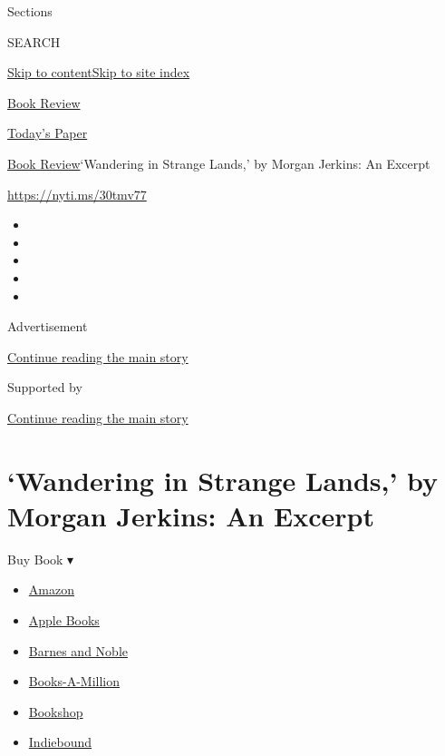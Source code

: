 Sections

SEARCH

\protect\hyperlink{site-content}{Skip to
content}\protect\hyperlink{site-index}{Skip to site index}

\href{https://www.nytimes.com/section/books/review}{Book Review}

\href{https://myaccount.nytimes.com/auth/login?response_type=cookie\&client_id=vi}{}

\href{https://www.nytimes.com/section/todayspaper}{Today's Paper}

\href{/section/books/review}{Book Review}\textbar{}`Wandering in Strange
Lands,' by Morgan Jerkins: An Excerpt

\url{https://nyti.ms/30tmv77}

\begin{itemize}
\item
\item
\item
\item
\item
\end{itemize}

Advertisement

\protect\hyperlink{after-top}{Continue reading the main story}

Supported by

\protect\hyperlink{after-sponsor}{Continue reading the main story}

\hypertarget{wandering-in-strange-lands-by-morgan-jerkins-an-excerpt}{%
\section{`Wandering in Strange Lands,' by Morgan Jerkins: An
Excerpt}\label{wandering-in-strange-lands-by-morgan-jerkins-an-excerpt}}

Buy Book ▾

\begin{itemize}
\tightlist
\item
  \href{https://www.amazon.com/gp/search?index=books\&tag=NYTBSREV-20\&field-keywords=Wandering+in+Strange+Lands\%3A+A+Daughter+of+the+Great+Migration+Reclaims+Her+Roots+Morgan+Jerkins}{Amazon}
\item
  \href{https://du-gae-books-dot-nyt-du-prd.appspot.com/buy?title=Wandering+in+Strange+Lands\%3A+A+Daughter+of+the+Great+Migration+Reclaims+Her+Roots\&author=Morgan+Jerkins}{Apple
  Books}
\item
  \href{https://www.anrdoezrs.net/click-7990613-11819508?url=https\%3A\%2F\%2Fwww.barnesandnoble.com\%2Fw\%2F\%3Fean\%3D9780062873040}{Barnes
  and Noble}
\item
  \href{https://www.anrdoezrs.net/click-7990613-35140?url=https\%3A\%2F\%2Fwww.booksamillion.com\%2Fp\%2FWandering\%2Bin\%2BStrange\%2BLands\%253A\%2BA\%2BDaughter\%2Bof\%2Bthe\%2BGreat\%2BMigration\%2BReclaims\%2BHer\%2BRoots\%2FMorgan\%2BJerkins\%2F9780062873040}{Books-A-Million}
\item
  \href{https://bookshop.org/a/3546/9780062873040}{Bookshop}
\item
  \href{https://www.indiebound.org/book/9780062873040?aff=NYT}{Indiebound}
\end{itemize}

